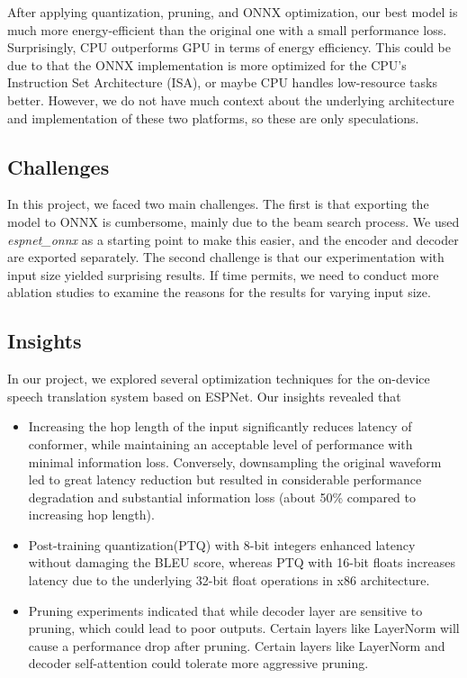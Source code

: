 \documentclass[11pt]{article}
\begin{document}
After applying quantization, pruning, and ONNX optimization, our best model is much more energy-efficient than the original one with a small performance loss. Surprisingly, CPU outperforms GPU in terms of energy efficiency. This could be due to that the ONNX implementation is more optimized for the CPU’s Instruction Set Architecture (ISA), or maybe CPU handles low-resource tasks better. However, we do not have much context about the underlying architecture and implementation of these two platforms, so these are only speculations.


\subsection{Challenges}
In this project, we faced two main challenges. The first is that exporting the model to ONNX is cumbersome, mainly due to the beam search process. We used \textit{espnet\_onnx} as a starting point to make this easier, and the encoder and decoder are exported separately. The second challenge is that our experimentation with input size yielded surprising results. If time permits, we need to conduct more ablation studies to examine the reasons for the results for varying input size.


\subsection{Insights}

In our project, we explored several optimization techniques for the on-device speech translation system based on ESPNet. Our insights revealed that 
\begin{itemize}
  \item Increasing the hop length of the input significantly reduces latency of conformer, while maintaining an acceptable level of performance with minimal information loss. Conversely, downsampling the original waveform led to great latency reduction but resulted in considerable performance degradation and substantial information loss (about 50\% compared to increasing hop length).
  \item Post-training quantization(PTQ) with 8-bit integers enhanced latency without damaging the BLEU score, whereas PTQ with 16-bit floats increases latency due to the underlying 32-bit float operations in x86 architecture.
  \item Pruning experiments indicated that while decoder layer are sensitive to pruning, which could lead to poor outputs. Certain layers like LayerNorm will cause a performance drop after pruning. Certain layers like LayerNorm and decoder self-attention could tolerate more aggressive pruning.
\end{itemize}
\end{document}

